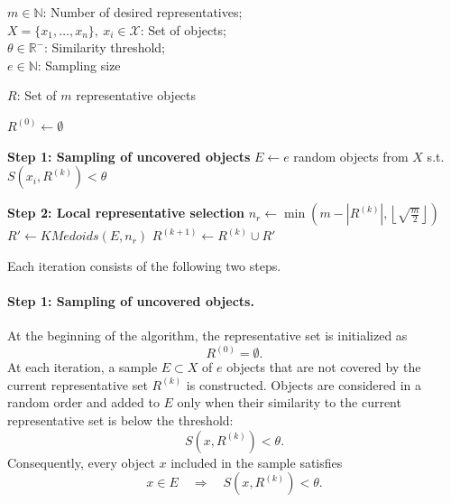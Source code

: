 \documentclass{ieeeaccess}
\newcommand{\representativeamount}{m}
\newcommand{\threshold}{\theta}
\newcommand{\samplesize}{e}
\newcommand{\kmedoidsalg}{KMedoids\xspace}
\newcommand{\inclusion}{IC\xspace}
\begin{document}
\begin{algorithm}[t]
\caption{Incremental coverage algorithm (\inclusion)}
\label{alg:inclusion}
\begin{algorithmic}[1]

\REQUIRE
$\representativeamount \in \mathbb{N}$: Number of desired representatives; \\
$X=\{x_1,\dots,x_n\},\ x_i\in\mathcal{X}$: Set of objects; \\
$\threshold\in\mathbb{R}^-$: Similarity threshold; \\
$e\in\mathbb{N}$: Sampling size\vspace{\baselineskip}

\ENSURE
$R$: Set of $\representativeamount$ representative objects\vspace{\baselineskip}

\STATE $R^{(0)}\gets\emptyset$

\WHILE{$|R^{(k)}|<\representativeamount$}

    \STATE \textbf{Step 1: Sampling of uncovered objects}
    \STATE $E\gets e$ random objects from $X$ s.t.
    $S(x_i,R^{(k)})<\threshold$ \COMMENT{If less than $\samplesize$}

    \STATE

    \STATE \textbf{Step 2: Local representative selection}
    \STATE $n_r\gets
    \min\left(
    \representativeamount-|R^{(k)}|,
    \left\lfloor\sqrt{\frac{\representativeamount}{2}}\right\rfloor
    \right)$
    \STATE $R'\gets\kmedoidsalg(E,n_r)$
    \STATE $R^{(k+1)}\gets R^{(k)}\cup R'$

\ENDWHILE

\end{algorithmic}
\end{algorithm}

Each iteration consists of the following two steps.

\paragraph*{Step 1: Sampling of uncovered objects.}

At the beginning of the algorithm, the representative set is initialized
as
\[
R^{(0)} = \emptyset.
\]
At each iteration, a sample $E \subset X$ of $e$ objects that are not
covered by the current representative set $R^{(k)}$ is constructed.
Objects are considered in a random order and added to $E$ only when
their similarity to the current representative set is below the
threshold:
\[
S(x,R^{(k)}) < \threshold.
\]
Consequently, every object $x$ included in the sample satisfies
\[
x \in E
\quad\Longrightarrow\quad
S(x,R^{(k)}) < \threshold.
\]
\end{document}
